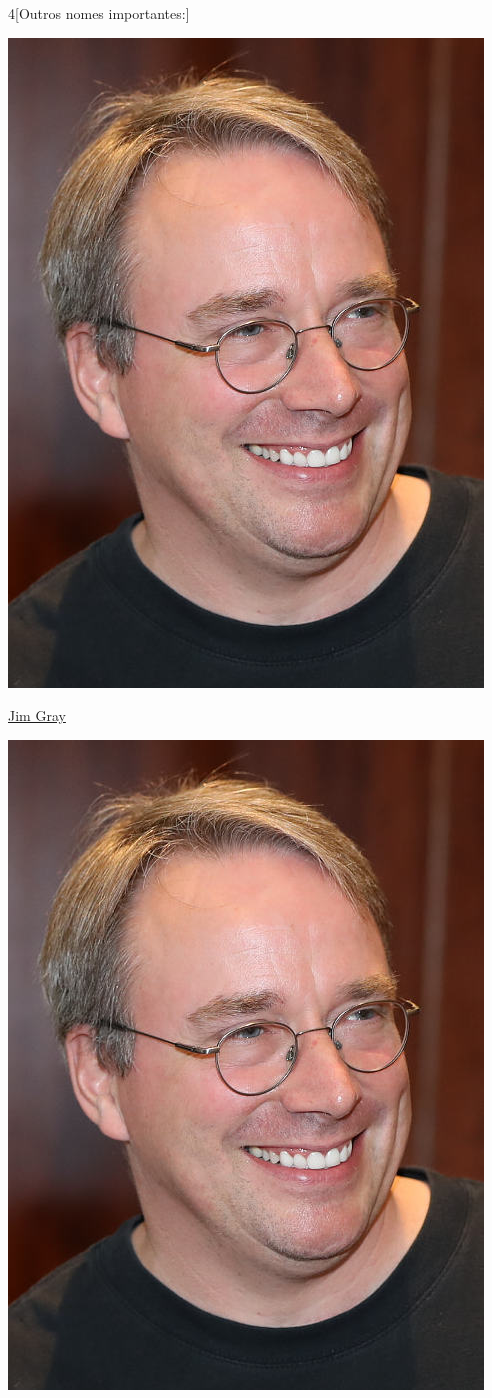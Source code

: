 \begin{multicols}{4}[Outros nomes importantes:]
\begin{center}
					\includegraphics[width=.8\columnwidth]{./IMG-GIT/CIENTISTAS/linus.jpeg}
\end{center}
				
\vfill\null

\columnbreak				
				
				\href{https://pt.wikipedia.org/wiki/Jim_Gray}{Jim Gray}
				
\begin{center}
					\includegraphics[width=.8\columnwidth]{./IMG-GIT/CIENTISTAS/linus.jpeg}
\end{center}
				

\end{multicols}
